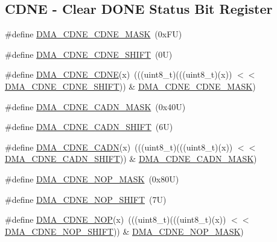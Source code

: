 \subsection*{C\+D\+NE -\/ Clear D\+O\+NE Status Bit Register}
\begin{DoxyCompactItemize}
\item 
\#define \mbox{\hyperlink{group___d_m_a___register___masks_ga42965bab0b0f5b27c28045c06f43d43d}{D\+M\+A\+\_\+\+C\+D\+N\+E\+\_\+\+C\+D\+N\+E\+\_\+\+M\+A\+SK}}~(0x\+F\+U)
\item 
\#define \mbox{\hyperlink{group___d_m_a___register___masks_ga4993325bdeae286074e4e8eace0e19ef}{D\+M\+A\+\_\+\+C\+D\+N\+E\+\_\+\+C\+D\+N\+E\+\_\+\+S\+H\+I\+FT}}~(0\+U)
\item 
\#define \mbox{\hyperlink{group___d_m_a___register___masks_gaad52359ad6d26f38404b2fffde7f9305}{D\+M\+A\+\_\+\+C\+D\+N\+E\+\_\+\+C\+D\+NE}}(x)~(((uint8\+\_\+t)(((uint8\+\_\+t)(x)) $<$$<$ \mbox{\hyperlink{group___d_m_a___register___masks_ga4993325bdeae286074e4e8eace0e19ef}{D\+M\+A\+\_\+\+C\+D\+N\+E\+\_\+\+C\+D\+N\+E\+\_\+\+S\+H\+I\+FT}})) \& \mbox{\hyperlink{group___d_m_a___register___masks_ga42965bab0b0f5b27c28045c06f43d43d}{D\+M\+A\+\_\+\+C\+D\+N\+E\+\_\+\+C\+D\+N\+E\+\_\+\+M\+A\+SK}})
\item 
\#define \mbox{\hyperlink{group___d_m_a___register___masks_gae1c134ccb3874e42a53d9294e1b1366c}{D\+M\+A\+\_\+\+C\+D\+N\+E\+\_\+\+C\+A\+D\+N\+\_\+\+M\+A\+SK}}~(0x40\+U)
\item 
\#define \mbox{\hyperlink{group___d_m_a___register___masks_ga45fa14dce342a18cb1ea15705a772671}{D\+M\+A\+\_\+\+C\+D\+N\+E\+\_\+\+C\+A\+D\+N\+\_\+\+S\+H\+I\+FT}}~(6\+U)
\item 
\#define \mbox{\hyperlink{group___d_m_a___register___masks_gabea38dcdc6bd2b4a2e3492fe8b2eb27d}{D\+M\+A\+\_\+\+C\+D\+N\+E\+\_\+\+C\+A\+DN}}(x)~(((uint8\+\_\+t)(((uint8\+\_\+t)(x)) $<$$<$ \mbox{\hyperlink{group___d_m_a___register___masks_ga45fa14dce342a18cb1ea15705a772671}{D\+M\+A\+\_\+\+C\+D\+N\+E\+\_\+\+C\+A\+D\+N\+\_\+\+S\+H\+I\+FT}})) \& \mbox{\hyperlink{group___d_m_a___register___masks_gae1c134ccb3874e42a53d9294e1b1366c}{D\+M\+A\+\_\+\+C\+D\+N\+E\+\_\+\+C\+A\+D\+N\+\_\+\+M\+A\+SK}})
\item 
\#define \mbox{\hyperlink{group___d_m_a___register___masks_ga8f22bcbf69b1598d53d60b7667079655}{D\+M\+A\+\_\+\+C\+D\+N\+E\+\_\+\+N\+O\+P\+\_\+\+M\+A\+SK}}~(0x80\+U)
\item 
\#define \mbox{\hyperlink{group___d_m_a___register___masks_gaa6e57536846087bab95bfb2f8895f626}{D\+M\+A\+\_\+\+C\+D\+N\+E\+\_\+\+N\+O\+P\+\_\+\+S\+H\+I\+FT}}~(7\+U)
\item 
\#define \mbox{\hyperlink{group___d_m_a___register___masks_ga9fc5b1a5dd45d819e3b8dc51c6e33db9}{D\+M\+A\+\_\+\+C\+D\+N\+E\+\_\+\+N\+OP}}(x)~(((uint8\+\_\+t)(((uint8\+\_\+t)(x)) $<$$<$ \mbox{\hyperlink{group___d_m_a___register___masks_gaa6e57536846087bab95bfb2f8895f626}{D\+M\+A\+\_\+\+C\+D\+N\+E\+\_\+\+N\+O\+P\+\_\+\+S\+H\+I\+FT}})) \& \mbox{\hyperlink{group___d_m_a___register___masks_ga8f22bcbf69b1598d53d60b7667079655}{D\+M\+A\+\_\+\+C\+D\+N\+E\+\_\+\+N\+O\+P\+\_\+\+M\+A\+SK}})
\end{DoxyCompactItemize}
